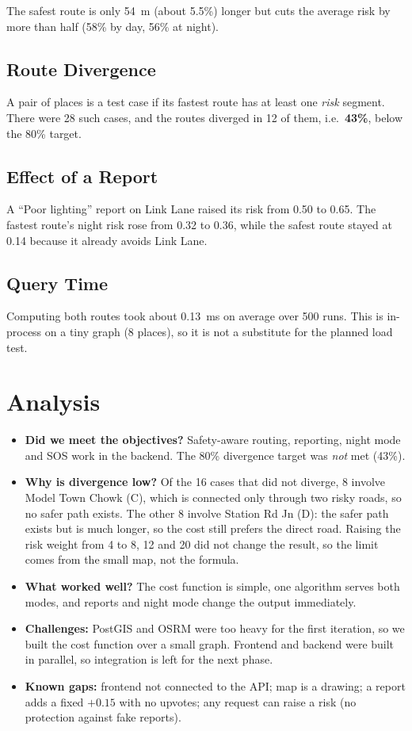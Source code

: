 \documentclass{tietreport}
\begin{document}
The safest route is only 54~m (about 5.5\%) longer but cuts the average
risk by more than half (58\% by day, 56\% at night).

\subsection{Route Divergence}

A pair of places is a test case if its fastest route has at least one
\emph{risk} segment. There were 28 such cases, and the routes diverged
in 12 of them, i.e.\ \textbf{43\%}, below the 80\% target.

\subsection{Effect of a Report}

A ``Poor lighting'' report on Link Lane raised its risk from 0.50 to
0.65. The fastest route's night risk rose from 0.32 to 0.36, while the
safest route stayed at 0.14 because it already avoids Link Lane.

\subsection{Query Time}

Computing both routes took about 0.13~ms on average over 500 runs. This
is in-process on a tiny graph (8 places), so it is not a substitute for
the planned load test.

\section{Analysis}

\begin{itemize}
  \item \textbf{Did we meet the objectives?} Safety-aware routing,
    reporting, night mode and SOS work in the backend. The 80\%
    divergence target was \emph{not} met (43\%).
  \item \textbf{Why is divergence low?} Of the 16 cases that did not
    diverge, 8 involve Model Town Chowk (C), which is connected only
    through two risky roads, so no safer path exists. The other 8
    involve Station Rd Jn (D): the safer path exists but is much longer,
    so the cost still prefers the direct road. Raising the risk weight
    from 4 to 8, 12 and 20 did not change the result, so the limit
    comes from the small map, not the formula.
  \item \textbf{What worked well?} The cost function is simple, one
    algorithm serves both modes, and reports and night mode change the
    output immediately.
  \item \textbf{Challenges:} PostGIS and OSRM were too heavy for the
    first iteration, so we built the cost function over a small graph.
    Frontend and backend were built in parallel, so integration is left
    for the next phase.
  \item \textbf{Known gaps:} frontend not connected to the API; map is a
    drawing; a report adds a fixed $+0.15$ with no upvotes; any request
    can raise a risk (no protection against fake reports).
\end{itemize}
\end{document}
